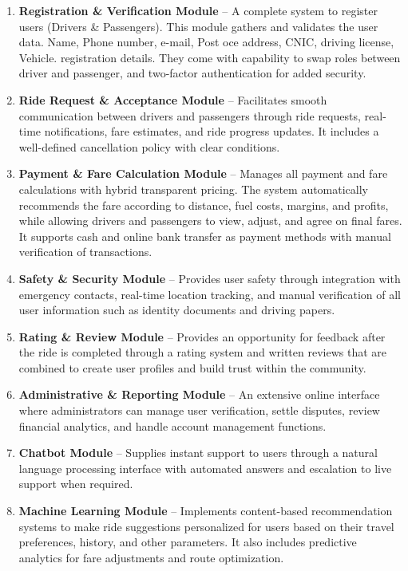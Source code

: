 \begin{enumerate}
    \item \textbf{Registration \& Verification Module} – A complete system to register users (Drivers & Passengers). This module gathers and validates the user data. Name, Phone number, e-mail, Post oce address, CNIC, driving license, Vehicle. registration details. They come with capability to swap roles between driver and passenger, and two-factor authentication for added security.

    \item \textbf{Ride Request \& Acceptance Module} – Facilitates smooth communication between drivers and passengers through ride requests, real-time notifications, fare estimates, and ride progress updates. It includes a well-defined cancellation policy with clear conditions.

    \item \textbf{Payment \& Fare Calculation Module} – Manages all payment and fare calculations with hybrid transparent pricing. The system automatically recommends the fare according to distance, fuel costs, margins, and profits, while allowing drivers and passengers to view, adjust, and agree on final fares. It supports cash and online bank transfer as payment methods with manual verification of transactions.

    \item \textbf{Safety \& Security Module} – Provides user safety through integration with emergency contacts, real-time location tracking, and manual verification of all user information such as identity documents and driving papers.

    \item \textbf{Rating \& Review Module} – Provides an opportunity for feedback after the ride is completed through a rating system and written reviews that are combined to create user profiles and build trust within the community.

    \item \textbf{Administrative \& Reporting Module} – An extensive online interface where administrators can manage user verification, settle disputes, review financial analytics, and handle account management functions.

    \item \textbf{Chatbot Module} – Supplies instant support to users through a natural language processing interface with automated answers and escalation to live support when required.

    \item \textbf{Machine Learning Module} – Implements content-based recommendation systems to make ride suggestions personalized for users based on their travel preferences, history, and other parameters. It also includes predictive analytics for fare adjustments and route optimization.


\end{enumerate}
